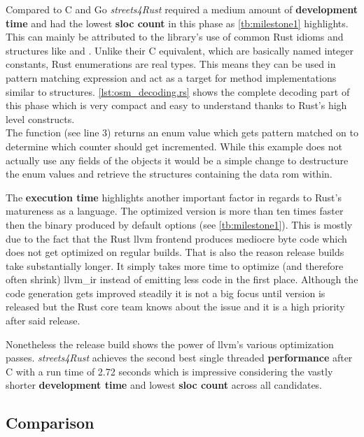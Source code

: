 Compared to C and Go \textit{streets4Rust} required a medium amount of \textbf{development time} and had the lowest \textbf{\gls{sloc} count} in this phase as \autoref{tb:milestone1} highlights. This can mainly be attributed to the library's use of common Rust idioms and structures like  and . Unlike their C equivalent, which are basically named integer constants, Rust enumerations are real types. This means they can be used in pattern matching expression and act as a target for method implementations similar to structures. \autoref{lst:osm_decoding.rs} shows the complete decoding part of this phase which is very compact and easy to understand thanks to Rust's high level constructs.
\\


The function  (see line 3) returns an enum value which gets pattern matched on to determine which counter should get incremented. While this example does not actually use any fields of the objects it would be a simple change to destructure the enum values and retrieve the structures containing the data rom within.

The \textbf{execution time} highlights another important factor in regards to Rust's matureness as a language. The optimized version is more than ten times faster then the binary produced by default options (see \autoref{tb:milestone1}). This is mostly due to the fact that the Rust \gls{llvm} frontend produces mediocre byte code which does not get optimized on regular builds. That is also the reason release builds take substantially longer. It simply takes more time to optimize (and therefore often shrink) \gls{llvm_ir} instead of emitting less code in the first place. Although the code generation gets improved steadily it is not a big focus until version  is released but the Rust core team knows about the issue and it is a high priority after said release.

Nonetheless the release build shows the power of \gls{llvm}'s various optimization passes. \textit{streets4Rust} achieves the second best single threaded \textbf{performance} after C with a run time of 2.72 seconds which is impressive considering the vastly shorter \textbf{development time} and lowest \textbf{\gls{sloc} count} across all candidates.

\subsection{Comparison}
\label{subsec:Implementation::Counting::Comparison}

